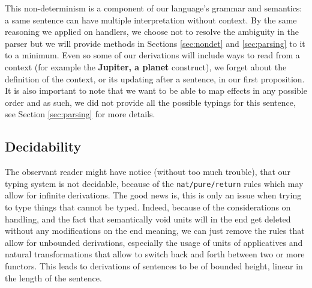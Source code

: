 This non-determinism is a component of our language's grammar and semantics:
a same sentence can have multiple interpretation without context.
By the same reasoning we applied on handlers, we choose not to resolve the
ambiguity in the parser but we will provide methods in Sections
\ref{sec:nondet} and \ref{sec:parsing} to it to a minimum.
Even so some of our derivations will include ways to read from a context (for
example the \textbf{Jupiter, a planet} construct), we forget about the
definition of the context, or its updating after a sentence, in our first
proposition.
It is also important to note that we want to be able to map effects in any
possible order and as such, we did not provide all the possible typings for
this sentence, see Section \ref{sec:parsing} for more details.

\subsection{Decidability}
The observant reader might have notice (without too much trouble), that our
typing system is not decidable, because of the \texttt{nat/pure/return} rules
which may allow for infinite derivations.
The good news is, this is only an issue when trying to type things that cannot
be typed.
Indeed, because of the considerations on handling, and the fact that
semantically void units will in the end get deleted without any modifications
on the end meaning, we can just remove the rules that allow for unbounded
derivations, especially the usage of units of applicatives and natural
transformations that allow to switch back and forth between two or more
functors.
This leads to derivations of sentences to be of bounded height, linear in the
length of the sentence.
